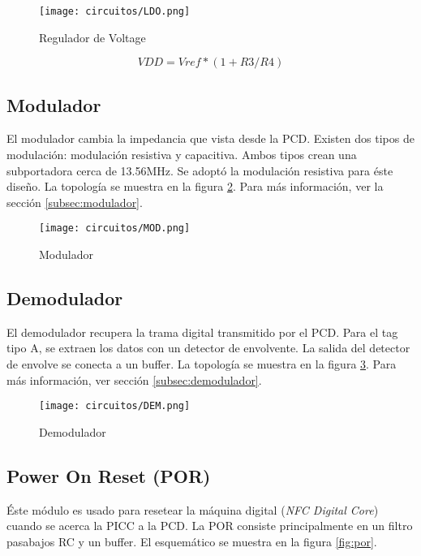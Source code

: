 \begin{figure}[H]
\centering
\texttt{[image: circuitos/LDO.png]}
\caption{Regulador de Voltage}
\label{fig:ldo}
\end{figure}

\begin{equation} \label{eq:vref}
VDD = Vref*(1+R3/R4)
\end{equation}

\subsection{Modulador}

El modulador cambia la impedancia que vista desde la PCD. Existen dos tipos de modulación: modulación resistiva y capacitiva. Ambos tipos crean una subportadora cerca de 13.56MHz. Se adoptó la modulación resistiva para éste diseño. La topología se muestra en la figura \ref{fig:mod}. Para más información, ver la sección \ref{subsec:modulador}.

\begin{figure}[H]
\centering
\texttt{[image: circuitos/MOD.png]}
\caption{Modulador}
\label{fig:mod}
\end{figure}

\subsection{Demodulador}

El demodulador recupera la trama digital transmitido por el PCD. Para el tag tipo A, se extraen los datos con un detector de envolvente. La salida del detector de envolve se conecta a un buffer. La topología se muestra en la figura \ref{fig:demod}. Para más información, ver sección \ref{subsec:demodulador}.

\begin{figure}[H]
\centering
\texttt{[image: circuitos/DEM.png]}
\caption{Demodulador}
\label{fig:demod}
\end{figure}

\subsection{Power On Reset (POR)}

Éste módulo es usado para resetear la máquina digital (\textit{NFC Digital Core}) cuando se acerca la PICC a la PCD. La POR consiste principalmente en un filtro pasabajos RC y un buffer. El esquemático se muestra en la figura \ref{fig:por}.

